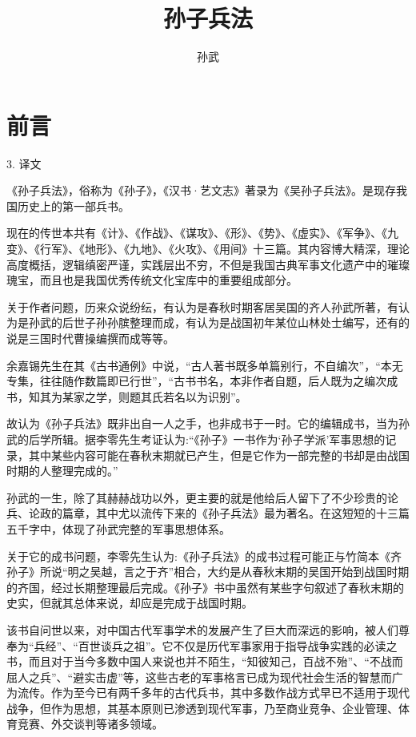 \documentclass[12pt,UTF8]{ctexbook}
\title{\heiti\zihao{0} 孙子兵法}
\author{孙武}
\date{}
\begin{document}
	
\maketitle
\tableofcontents

\frontmatter
\chapter{前言}
    
    3. 译文
    
《孙子兵法》，俗称为《孙子》，《汉书·艺文志》著录为《吴孙子兵法》。是现存我国历史上的第一部兵书。

现在的传世本共有《计》、《作战》、《谋攻》、《形》、《势》、《虚实》、《军争》、《九变》、《行军》、《地形》、《九地》、《火攻》、《用间》十三篇。其内容博大精深，理论高度概括，逻辑缜密严谨，实践层出不穷，不但是我国古典军事文化遗产中的璀璨瑰宝，而且也是我国优秀传统文化宝库中的重要组成部分。

关于作者问题，历来众说纷纭，有认为是春秋时期客居吴国的齐人孙武所著，有认为是孙武的后世子孙孙膑整理而成，有认为是战国初年某位山林处士编写，还有的说是三国时代曹操编撰而成等等。

余嘉锡先生在其《古书通例》中说，“古人著书既多单篇别行，不自编次”，“本无专集，往往随作数篇即已行世”，“古书书名，本非作者自题，后人既为之编次成书，知其为某家之学，则题其氏若名以为识别”。

故认为《孙子兵法》既非出自一人之手，也非成书于一时。它的编辑成书，当为孙武的后学所辑。据李零先生考证认为:“《孙子》一书作为‘孙子学派’军事思想的记录，其中某些内容可能在春秋末期就已产生，但是它作为一部完整的书却是由战国时期的人整理完成的。”

孙武的一生，除了其赫赫战功以外，更主要的就是他给后人留下了不少珍贵的论兵、论政的篇章，其中尤以流传下来的《孙子兵法》最为著名。在这短短的十三篇五千字中，体现了孙武完整的军事思想体系。

关于它的成书问题，李零先生认为:《孙子兵法》的成书过程可能正与竹简本《齐孙子》所说“明之吴越，言之于齐”相合，大约是从春秋末期的吴国开始到战国时期的齐国，经过长期整理最后完成。《孙子》书中虽然有某些字句叙述了春秋末期的史实，但就其总体来说，却应是完成于战国时期。

该书自问世以来，对中国古代军事学术的发展产生了巨大而深远的影响，被人们尊奉为“兵经”、“百世谈兵之祖”。它不仅是历代军事家用于指导战争实践的必读之书，而且对于当今多数中国人来说也并不陌生，“知彼知己，百战不殆”、“不战而屈人之兵”、“避实击虚”等，这些古老的军事格言已成为现代社会生活的智慧而广为流传。作为至今已有两千多年的古代兵书，其中多数作战方式早已不适用于现代战争，但作为思想，其基本原则已渗透到现代军事，乃至商业竞争、企业管理、体育竞赛、外交谈判等诸多领域。
\end{document}
